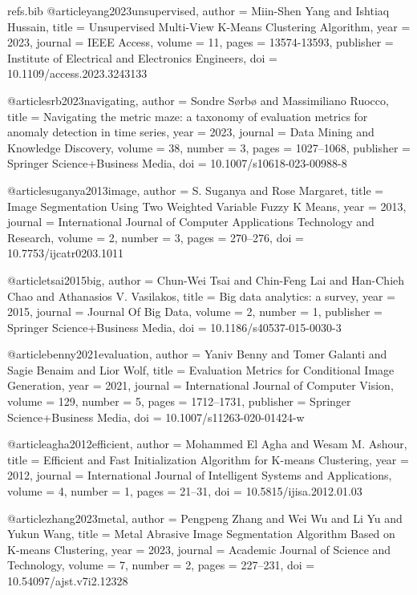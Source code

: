 \begin{filecontents*}[overwrite]{refs.bib}
@article{yang2023unsupervised,
  author = {Miin-Shen Yang and Ishtiaq Hussain},
  title = {{Unsupervised Multi-View K-Means Clustering Algorithm}},
  year = {2023},
  journal = {IEEE Access},
  volume = {11},
  pages = {13574-13593},
  publisher = {Institute of Electrical and Electronics Engineers},
  doi = {10.1109/access.2023.3243133}
}

@article{srb2023navigating,
  author = {Sondre S{\o}rb{\o} and Massimiliano Ruocco},
  title = {{Navigating the metric maze: a taxonomy of evaluation metrics for anomaly detection in time series}},
  year = {2023},
  journal = {Data Mining and Knowledge Discovery},
  volume = {38},
  number = {3},
  pages = {1027--1068},
  publisher = {Springer Science+Business Media},
  doi = {10.1007/s10618-023-00988-8}
}

@article{suganya2013image,
  author = {S. Suganya and Rose Margaret},
  title = {{Image Segmentation Using Two Weighted Variable Fuzzy K Means}},
  year = {2013},
  journal = {International Journal of Computer Applications Technology and Research},
  volume = {2},
  number = {3},
  pages = {270--276},
  doi = {10.7753/ijcatr0203.1011}
}

@article{tsai2015big,
  author = {Chun{-}Wei Tsai and Chin{-}Feng Lai and Han{-}Chieh Chao and Athanasios V. Vasilakos},
  title = {{Big data analytics: a survey}},
  year = {2015},
  journal = {Journal Of Big Data},
  volume = {2},
  number = {1},
  publisher = {Springer Science+Business Media},
  doi = {10.1186/s40537-015-0030-3}
}

@article{benny2021evaluation,
  author = {Yaniv Benny and Tomer Galanti and Sagie Benaim and Lior Wolf},
  title = {{Evaluation Metrics for Conditional Image Generation}},
  year = {2021},
  journal = {International Journal of Computer Vision},
  volume = {129},
  number = {5},
  pages = {1712--1731},
  publisher = {Springer Science+Business Media},
  doi = {10.1007/s11263-020-01424-w}
}

@article{agha2012efficient,
  author = {Mohammed El Agha and Wesam M. Ashour},
  title = {{Efficient and Fast Initialization Algorithm for K-means Clustering}},
  year = {2012},
  journal = {International Journal of Intelligent Systems and Applications},
  volume = {4},
  number = {1},
  pages = {21--31},
  doi = {10.5815/ijisa.2012.01.03}
}

@article{zhang2023metal,
  author = {Pengpeng Zhang and Wei Wu and Li Yu and Yukun Wang},
  title = {{Metal Abrasive Image Segmentation Algorithm Based on K-means Clustering}},
  year = {2023},
  journal = {Academic Journal of Science and Technology},
  volume = {7},
  number = {2},
  pages = {227--231},
  doi = {10.54097/ajst.v7i2.12328}
}


\end{filecontents*}
